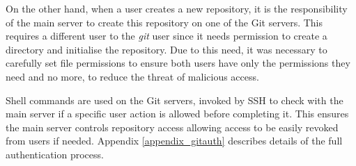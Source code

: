 On the other hand, when a user creates a new repository, it is the responsibility of the main server to create this repository on one of the Git servers. This requires a different user to the \emph{git} user since it needs permission to create a directory and initialise the repository. Due to this need, it was necessary to carefully set file permissions to ensure both users have only the permissions they need and no more, to reduce the threat of malicious access.

Shell commands are used on the Git servers, invoked by SSH to check with the main server if a specific user action is allowed before completing it. This ensures the main server controls repository access allowing access to be easily revoked from users if needed. Appendix \ref{appendix_gitauth} describes details of the full authentication process.



